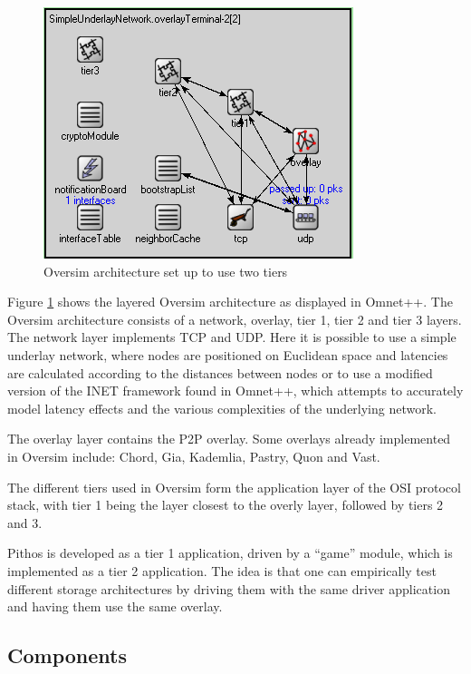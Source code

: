 \documentclass[10pt,a4paper,conference]{IEEEtran}
\begin{document}
\begin{figure}[htbp]
 \centering
 \includegraphics[width=\columnwidth]{Oversim_arch}
 \caption{Oversim architecture set up to use two tiers}
 \label{fig_oversim_arch}
\end{figure}
%
Figure \ref{fig_oversim_arch} shows the layered Oversim architecture as displayed in Omnet++. The Oversim architecture consists of a network,
overlay, tier 1, tier 2 and tier 3 layers. The network layer implements TCP and UDP. Here it is possible to use a simple underlay network, where
nodes are positioned on Euclidean space and latencies are calculated according to the distances between nodes or to use a modified version of the
INET framework found in Omnet++, which attempts to accurately model latency effects and the various complexities of the underlying network.

The overlay layer contains the P2P overlay. Some overlays already implemented in Oversim include: Chord, Gia, Kademlia, Pastry, Quon and Vast.

The different tiers used in Oversim form the application layer of the OSI protocol stack, with tier 1 being the layer closest to the overly layer,
followed by tiers 2 and 3.

Pithos is developed as a tier 1 application, driven by a ``game'' module, which is implemented as a tier 2 application. The idea is that one can
empirically test different storage architectures by driving them with the same driver application and having them use the same overlay.

\subsection{Components}
\end{document}
